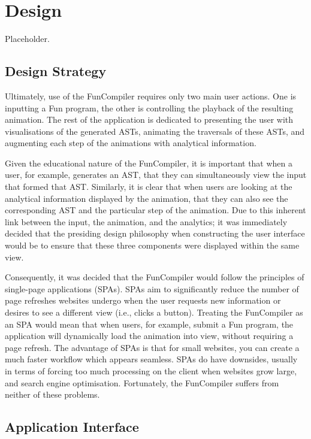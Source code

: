 \documentclass{l4proj}
\begin{document}

\chapter{Design}
Placeholder.

\section{Design Strategy}
Ultimately, use of the FunCompiler requires only two main user actions. One is inputting a Fun program, the other is controlling the playback of the resulting animation. The rest of the application is dedicated to presenting the user with visualisations of the generated ASTs, animating the traversals of these ASTs, and augmenting each step of the animations with analytical information.

Given the educational nature of the FunCompiler, it is important that when a user, for example, generates an AST, that they can simultaneously view the input that formed that AST. Similarly, it is clear that when users are looking at the analytical information displayed by the animation, that they can also see the corresponding AST and the particular step of the animation. Due to this inherent link between the input, the animation, and the analytics; it was immediately decided that the presiding design philosophy when constructing the user interface would be to ensure that these three components were displayed within the same view.

Consequently, it was decided that the FunCompiler would follow the principles of single-page applications (SPAs). SPAs aim to significantly reduce the number of page refreshes websites undergo when the user requests new information or desires to see a different view (i.e., clicks a button). Treating the FunCompiler as an SPA would mean that when users, for example, submit a Fun program, the application will dynamically load the animation into view, without requiring a page refresh. The advantage of SPAs is that for small websites, you can create a much faster workflow which appears seamless. SPAs do have downsides, usually in terms of forcing too much processing on the client when websites grow large, and search engine optimisation. Fortunately, the FunCompiler suffers from neither of these problems.

\section{Application Interface}

\begin{appendices}

\end{appendices}




\end{document}
